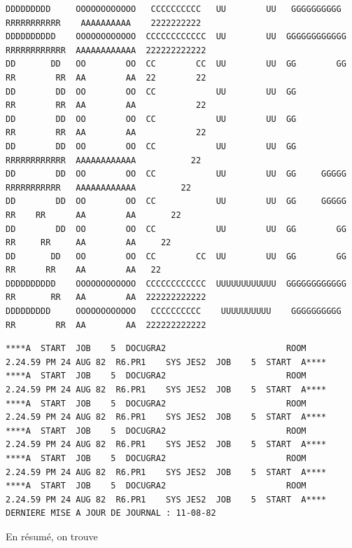 {\fontsize{4}{5}\selectfont
\begin{verbatim}
DDDDDDDDD     OOOOOOOOOOOO   CCCCCCCCCC   UU        UU   GGGGGGGGGG   RRRRRRRRRRR    AAAAAAAAAA    2222222222
DDDDDDDDDD    OOOOOOOOOOOO  CCCCCCCCCCCC  UU        UU  GGGGGGGGGGGG  RRRRRRRRRRRR  AAAAAAAAAAAA  222222222222
DD       DD   OO        OO  CC        CC  UU        UU  GG        GG  RR        RR  AA        AA  22        22
DD        DD  OO        OO  CC            UU        UU  GG            RR        RR  AA        AA            22
DD        DD  OO        OO  CC            UU        UU  GG            RR        RR  AA        AA            22
DD        DD  OO        OO  CC            UU        UU  GG            RRRRRRRRRRRR  AAAAAAAAAAAA           22
DD        DD  OO        OO  CC            UU        UU  GG     GGGGG  RRRRRRRRRRR   AAAAAAAAAAAA         22
DD        DD  OO        OO  CC            UU        UU  GG     GGGGG  RR    RR      AA        AA       22
DD        DD  OO        OO  CC            UU        UU  GG        GG  RR     RR     AA        AA     22
DD       DD   OO        OO  CC        CC  UU        UU  GG        GG  RR      RR    AA        AA   22
DDDDDDDDDD    OOOOOOOOOOOO  CCCCCCCCCCCC  UUUUUUUUUUUU  GGGGGGGGGGGG  RR       RR   AA        AA  222222222222
DDDDDDDDD     OOOOOOOOOOOO   CCCCCCCCCC    UUUUUUUUUU    GGGGGGGGGG   RR        RR  AA        AA  222222222222
\end{verbatim}
}

{\fontsize{4}{5}\selectfont
\begin{verbatim}
****A  START  JOB    5  DOCUGRA2                        ROOM        2.24.59 PM 24 AUG 82  R6.PR1    SYS JES2  JOB    5  START  A****
****A  START  JOB    5  DOCUGRA2                        ROOM        2.24.59 PM 24 AUG 82  R6.PR1    SYS JES2  JOB    5  START  A****
****A  START  JOB    5  DOCUGRA2                        ROOM        2.24.59 PM 24 AUG 82  R6.PR1    SYS JES2  JOB    5  START  A****
****A  START  JOB    5  DOCUGRA2                        ROOM        2.24.59 PM 24 AUG 82  R6.PR1    SYS JES2  JOB    5  START  A****
****A  START  JOB    5  DOCUGRA2                        ROOM        2.24.59 PM 24 AUG 82  R6.PR1    SYS JES2  JOB    5  START  A****
****A  START  JOB    5  DOCUGRA2                        ROOM        2.24.59 PM 24 AUG 82  R6.PR1    SYS JES2  JOB    5  START  A****
DERNIERE MISE A JOUR DE JOURNAL : 11-08-82
\end{verbatim}
}


En résumé, on trouve


